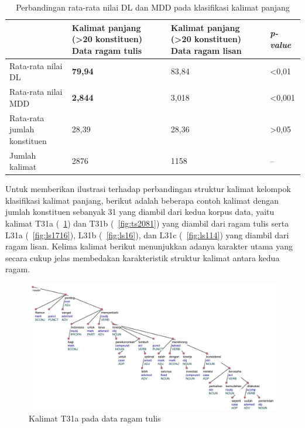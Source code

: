 \begin{table}
\begin{center}
\begin{small}
\caption{Perbandingan rata-rata nilai DL dan MDD pada klasifikasi kalimat panjang}  \label{tab:DL_MDD_panjang}
\begin{tabular}{ | p{3.2cm} | p{3.2cm} | p{3.2cm} | p{2cm} |}
    \hline
 & Kalimat panjang \newline (\textgreater20 konstituen) \newline Data ragam tulis & Kalimat panjang \newline (\textgreater20 konstituen) \newline Data ragam lisan & \textit{p-value} \\ \hline
 Rata-rata nilai DL & \textbf{79,94} & 83,84 & \textless 0,01 \\ \hline
 Rata-rata nilai MDD & \textbf{2,844} & 3,018 & \textless 0,001 \\ \hline
 Rata-rata jumlah konstituen & 28,39 & 28,36 & \textgreater 0,05 \\ \hline
 Jumlah kalimat & 2876 & 1158 & -- \\ \hline
   \end{tabular}
   \end{small}
\end{center}
\end{table}

Untuk memberikan ilustrasi terhadap perbandingan struktur kalimat kelompok klasifikasi kalimat panjang, berikut adalah beberapa contoh kalimat dengan jumlah konstituen sebanyak 31 yang diambil dari kedua korpus data, yaitu kalimat T31a (\pic~\ref{fig:ts2079}) dan T31b (\pic~\ref{fig:ts2081}) yang diambil dari ragam tulis serta L31a (\pic~\ref{fig:ls1716}), L31b (\pic~\ref{fig:ls16}), dan L31c (\pic~\ref{fig:ls114}) yang diambil dari ragam lisan. Kelima kalimat berikut menunjukkan adanya karakter utama yang secara cukup jelas membedakan karakteristik struktur kalimat antara kedua ragam. 

\begin{figure}
	\centering \includegraphics[width=1
	\textwidth] {pics/ts2079.jpg} 
	\caption{Kalimat T31a pada data ragam tulis} 
	\label{fig:ts2079} 
\end{figure}

